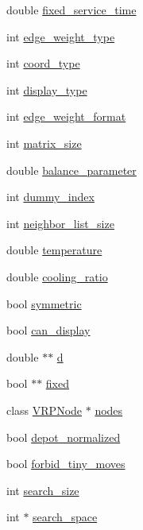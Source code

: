\begin{DoxyCompactItemize}
\item 
double \hyperlink{class_v_r_p_a31a699aee99ab5ceb4ef1a8ac517937f}{fixed\_\-service\_\-time}
\item 
int \hyperlink{class_v_r_p_aae0d4e2df1a97802b5c5f9e0c0757ef0}{edge\_\-weight\_\-type}
\item 
int \hyperlink{class_v_r_p_aa20a5dbd3e3070a63a72a76c2ff46722}{coord\_\-type}
\item 
int \hyperlink{class_v_r_p_a47e17e1b022eac02504a129ba26f28b8}{display\_\-type}
\item 
int \hyperlink{class_v_r_p_a4de4cdf0660a89b599a3d2086698a27c}{edge\_\-weight\_\-format}
\item 
int \hyperlink{class_v_r_p_aa84ae03f2bd1c91491f270a672f8fcd1}{matrix\_\-size}
\item 
double \hyperlink{class_v_r_p_a90a29b6636daa9e4ada8c01069b52d07}{balance\_\-parameter}
\item 
int \hyperlink{class_v_r_p_a8f07dd3927e226e01c2f77f380c17ac3}{dummy\_\-index}
\item 
int \hyperlink{class_v_r_p_ac68b2c8f1b906dcce3b32a3c308240b3}{neighbor\_\-list\_\-size}
\item 
double \hyperlink{class_v_r_p_a328026fe60722fe6cc09a4c5aae404b8}{temperature}
\item 
double \hyperlink{class_v_r_p_a68589860bea9d0a278ab57bbefb3f8a0}{cooling\_\-ratio}
\item 
bool \hyperlink{class_v_r_p_afaf85ef2953e205d5eae0b1355ffe973}{symmetric}
\item 
bool \hyperlink{class_v_r_p_a22da6861faa4543f73b7a66d89a92f91}{can\_\-display}
\item 
double $\ast$$\ast$ \hyperlink{class_v_r_p_ade83b7d5a9db82ff85e730daa4caac5a}{d}
\item 
bool $\ast$$\ast$ \hyperlink{class_v_r_p_ab4390370cb73c51ac6ebe12aaf51f2c4}{fixed}
\item 
class \hyperlink{class_v_r_p_node}{VRPNode} $\ast$ \hyperlink{class_v_r_p_a35f503e16fdbf0d9bd3e79d79bc70acd}{nodes}
\item 
bool \hyperlink{class_v_r_p_a464f8802b533b943a25e7b47e15e7cd1}{depot\_\-normalized}
\item 
bool \hyperlink{class_v_r_p_a7de6d41fe877d981e8a5bf5b25a39cab}{forbid\_\-tiny\_\-moves}
\item 
int \hyperlink{class_v_r_p_a30b72e877a153354bd5d8411c4dd5971}{search\_\-size}
\item 
int $\ast$ \hyperlink{class_v_r_p_aff4f38285d931237cc1cb7006d1d4fcd}{search\_\-space}

\end{DoxyCompactItemize}
